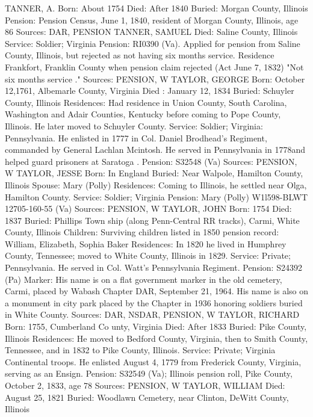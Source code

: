 TANNER, A.
Born: About 1754
Died: After 1840 
Buried: Morgan County, Illinois 
Pension: Pension Census, June 1, 1840, resident of Morgan County, Illinois, age 86 
Sources: DAR, PENSION 
TANNER, SAMUEL
Died: Saline County, Illinois
Service: Soldier; Virginia Pension: RI0390 (Va). Applied for pension from Saline County, Illinois, but re­jected as not having six months service. Residence Frankfort, Franklin County when pension claim rejected (Act June 7, 1832) "Not six months service ." 
Sources: PENSION, W 
TAYLOR, GEORGE 
Born: October 12,1761, Albemarle County, Virginia 
Died : January 12, 1834 
Buried: Schuyler County, Illinois 
Residences: Had residence in Union County, South Carolina, Washington and Adair Counties, Kentucky before coming to Pope County, Illinois. He later moved to Schuyler County. 
Service: Soldier; Virginia: Pennsylvania. He enlisted in 1777 in Col. Daniel Brodhead's Regiment, commanded by General Lachlan Mcintosh. He served in Pennsylvania in 1778and helped guard prisoners at Saratoga . 
Pension: S32548 (Va) 
Sources: PENSION, W 
TAYLOR, JESSE 
Born: In England 
Buried: Near Walpole, Hamilton County, Illinois 
Spouse: Mary (Polly) 
Residences: Coming to Illinois, he settled near Olga, Hamilton County.
Service: Soldier; Virginia Pension: Mary (Polly) W1l598-BLWT 12705-160-55 (Va) 
Sources: PENSION, W 
TAYLOR, JOHN 
Born: 1754 
 Died: 1837
Buried: Phillips Town ship (along Penn-Central RR tracks), Carmi, White County, Illinois 
Children: Surviving children listed in 1850 pension record: William, Elizabeth, Sophia Baker Residences: In 1820 he lived in Humphrey County, Tennessee; moved to White County, Illinois in 1829.
Service: Private; Pennsylvania. He served in Col. Watt's Pennsylvania Regiment. Pension: S24392 (Pa)
Marker: His name is on a flat government marker in the old cemetery, Carmi, placed by Wabash Chapter DAR, September 21, 1964. His name is also on a monument in city park placed by the Chapter in 1936 honoring soldiers buried in White County. 
Sources: DAR, NSDAR, PENSION, W 
TAYLOR, RICHARD 
Born: 1755, Cumberland Co unty, Virginia
Died: After 1833
Buried: Pike County, Illinois 
Residences: He moved to Bedford County, Virginia, then to Smith County, Tennessee, and in 1832 to Pike County, Illinois.
Service: Private; Virginia Continental troops. He enlisted August 4, 1779 from Frederick County, Virginia, serving as an Ensign. Pension: S32549 (Va); Illinois pension roll, Pike County, October 2, 1833, age 78
Sources: PENSION, W 
TAYLOR, WILLIAM 
Died: August 25, 1821
Buried: Woodlawn Cemetery, near Clinton, DeWitt County, Illinois
